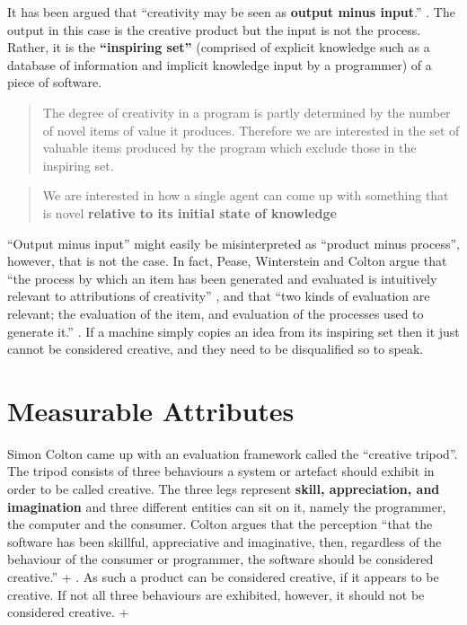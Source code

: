It has been argued that ``creativity may be seen as \textbf{output minus input}.'' \parencite[p.2, my emphasis]{Pease2001}. The output in this case is the creative product but the input is not the process. Rather, it is the \textbf{``inspiring set''} (comprised of explicit knowledge such as a database of information and implicit knowledge input by a programmer) of a piece of software.

\begin{quote}
  The degree of creativity in a program is partly determined by the number of novel items of value it produces. Therefore we are interested in the set of valuable items produced by the program which exclude those in the inspiring set. \parencite[p.3]{Colton2001}
\end{quote}

\begin{quote}
  We are interested in how a single agent can come up with something that is novel \textbf{relative to its initial state of knowledge} \parencite[p.72, his emphasis]{Ritchie2007}
\end{quote}

``Output minus input'' might easily be misinterpreted as ``product minus process'', however, that is not the case. In fact, Pease, Winterstein and Colton argue that ``the process by which an item has been generated and evaluated is intuitively relevant to attributions of creativity'' \citeyear[p.6]{Pease2001}, and that ``two kinds of evaluation are relevant; the evaluation of the item, and evaluation of the processes used to generate it.'' \citeyear[p.7]{Pease2001}. If a machine simply copies an idea from its inspiring set then it just cannot be considered creative, and they need to be disqualified so to speak.


\section{Measurable Attributes}

Simon Colton came up with an evaluation framework called the ``creative tripod''. The tripod consists of three behaviours a system or artefact should exhibit in order to be called creative. The three legs represent \textbf{skill, appreciation, and imagination} and three different entities can sit on it, namely the programmer, the computer and the consumer. Colton argues that the perception ``that the software has been skillful, appreciative and imaginative, then, regardless of the behaviour of the consumer or programmer, the software should be considered creative.'' \citeyear[p.5]{Colton2008a} + \citeyear[p.5]{Colton2008}. As such a product can be considered creative, if it appears to be creative. If not all three behaviours are exhibited, however, it should not be considered creative. \parencite[p.5]{Colton2008a} + \parencite[p.5]{Colton2008}

